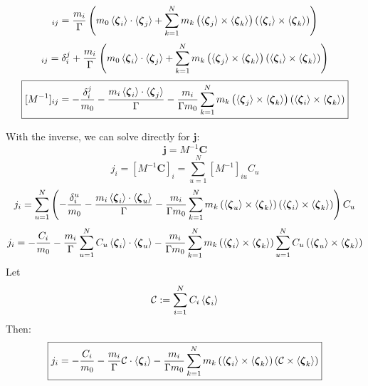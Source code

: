 \documentclass[10pt]{report}
\begin{document}
\begin{equation}[DE(m_0I_2-E^TDE)^{-1}E^T]_{ij}=\frac{m_i}{\Gamma}\left(m_0\braket{\boldsymbol{\zeta}_i}\cdot\braket{\boldsymbol{\zeta}_j}+\sum_{k=1}^Nm_k\left(\braket{\boldsymbol{\zeta}_j}\times\braket{\boldsymbol{\zeta}_k}\right)\left(\braket{\boldsymbol{\zeta}_i}\times\braket{\boldsymbol{\zeta}_k}\right)\right)\end{equation}
\begin{equation}[I+DE(m_0I_2-E^TDE)^{-1}E^T]_{ij}=\delta_i^j+\frac{m_i}{\Gamma}\left(m_0\braket{\boldsymbol{\zeta}_i}\cdot\braket{\boldsymbol{\zeta}_j}+\sum_{k=1}^Nm_k\left(\braket{\boldsymbol{\zeta}_j}\times\braket{\boldsymbol{\zeta}_k}\right)\left(\braket{\boldsymbol{\zeta}_i}\times\braket{\boldsymbol{\zeta}_k}\right)\right)\end{equation}
\begin{equation}\boxed{[M^{-1}]_{ij}=-\frac{\delta_i^j}{m_0}-\frac{m_i\braket{\boldsymbol{\zeta}_i}\cdot\braket{\boldsymbol{\zeta}_j}}{\Gamma}-\frac{m_i}{\Gamma m_0}\sum_{k=1}^Nm_k\left(\braket{\boldsymbol{\zeta}_j}\times\braket{\boldsymbol{\zeta}_k}\right)\left(\braket{\boldsymbol{\zeta}_i}\times\braket{\boldsymbol{\zeta}_k}\right)}\end{equation}

\noindent With the inverse, we can solve directly for $\boldsymbol{j}$:
\begin{equation}\boldsymbol{j}=M^{-1}\boldsymbol{C}\end{equation}
\begin{equation}j_i=[M^{-1}\boldsymbol{C}]_i=\sum_{u=1}^N[M^{-1}]_{iu}C_u\end{equation}
\begin{equation}j_i=\sum_{u=1}^N\left(-\frac{\delta_i^u}{m_0}-\frac{m_i\braket{\boldsymbol{\zeta}_i}\cdot\braket{\boldsymbol{\zeta}_u}}{\Gamma}-\frac{m_i}{\Gamma m_0}\sum_{k=1}^Nm_k\left(\braket{\boldsymbol{\zeta}_u}\times\braket{\boldsymbol{\zeta}_k}\right)\left(\braket{\boldsymbol{\zeta}_i}\times\braket{\boldsymbol{\zeta}_k}\right)\right)C_u\end{equation}
\begin{equation}j_i=-\frac{C_i}{m_0}-\frac{m_i}{\Gamma}\sum_{u=1}^NC_u\braket{\boldsymbol{\zeta}_i}\cdot\braket{\boldsymbol{\zeta}_u}-\frac{m_i}{\Gamma m_0}\sum_{k=1}^Nm_k\left(\braket{\boldsymbol{\zeta}_i}\times\braket{\boldsymbol{\zeta}_k}\right)\sum_{u=1}^NC_u\left(\braket{\boldsymbol{\zeta}_u}\times\braket{\boldsymbol{\zeta}_k}\right)\end{equation}
Let
\begin{equation}\mathcal{C}:=\sum_{i=1}^NC_i\braket{\boldsymbol{\zeta}_i}\end{equation}
Then:
\begin{equation}\boxed{j_i=-\frac{C_i}{m_0}-\frac{m_i}{\Gamma}\mathcal{C}\cdot\braket{\boldsymbol{\zeta}_i}-\frac{m_i}{\Gamma m_0}\sum_{k=1}^Nm_k\left(\braket{\boldsymbol{\zeta}_i}\times\braket{\boldsymbol{\zeta}_k}\right)\left(\mathcal{C}\times\braket{\boldsymbol{\zeta}_k}\right)}\end{equation}
\end{document}
